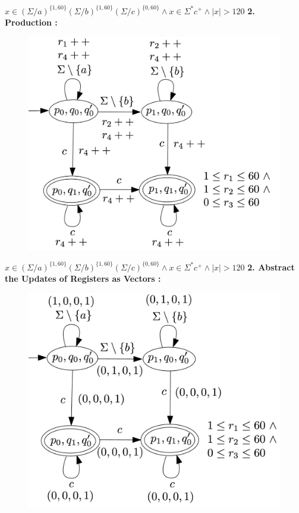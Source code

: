 \documentclass[landscape]{beamer}
\begin{document}
\begin{frame}{$ x\in (\Sigma / a)^{\{1,60\}}(\Sigma / b)^{\{1,60\}}(\Sigma / c)^{\{0,60\}} \wedge x\in \Sigma^*c^+ \wedge |x| > 120$}
  \textbf{2. Production : }
  \begin{figure}
    \includegraphics[width=.65\linewidth]{overview_product.jpg}
  \end{figure}
\end{frame}
\begin{frame}{$ x\in (\Sigma / a)^{\{1,60\}}(\Sigma / b)^{\{1,60\}}(\Sigma / c)^{\{0,60\}} \wedge x\in \Sigma^*c^+ \wedge |x| > 120$}
  \textbf{2. Abstract the Updates of Registers as Vectors : }
  \begin{figure}
    \includegraphics[width=.65\linewidth]{overview_product_vector.jpg}
  \end{figure}
\end{frame}
\end{document}
